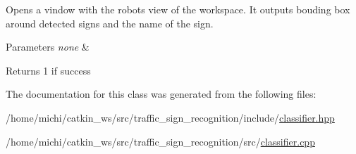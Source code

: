 Opens a vindow with the robot\textquotesingle{}s view of the workspace. It outputs bouding box around detected signs and the name of the sign. 


\begin{DoxyParams}{Parameters}
{\em none} & \\
\hline
\end{DoxyParams}
\begin{DoxyReturn}{Returns}
1 if success 
\end{DoxyReturn}


The documentation for this class was generated from the following files\+:\begin{DoxyCompactItemize}
\item 
/home/michi/catkin\+\_\+ws/src/traffic\+\_\+sign\+\_\+recognition/include/\hyperlink{classifier_8hpp}{classifier.\+hpp}\item 
/home/michi/catkin\+\_\+ws/src/traffic\+\_\+sign\+\_\+recognition/src/\hyperlink{classifier_8cpp}{classifier.\+cpp}\end{DoxyCompactItemize}
